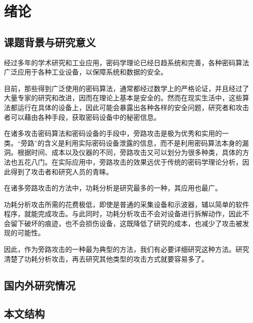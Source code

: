 

\chapter{绪论}

\section{课题背景与研究意义}

经过多年的学术研究和工业应用，密码学理论已经日趋系统和完善，各种密码算法广泛应用于各种工业设备，以保障系统和数据的安全。

目前，那些得到广泛使用的密码算法，通常都经过数学上的严格论证，并且经过了大量专家的研究和改进，因而在理论上基本是安全的。然而在现实生活中，这些算法都运行在具体的设备上，因此可能会暴露出各种各样的安全问题，研究者和攻击者可以藉由各种手段，获取密码设备中的秘密信息。

在诸多攻击密码算法和密码设备的手段中，旁路攻击是极为优秀和实用的一类。“旁路”的含义是利用实际密码设备泄露的信息，而不是利用密码算法本身的漏洞。根据时间、成本以及仪器的不同，旁路攻击又可以划分为很多种类，具体的方法也五花八门。在实际应用中，旁路攻击的效果远优于传统的密码学理论分析，因此得到了攻击者和研究人员的青睐。

在诸多旁路攻击的方法中，功耗分析是研究最多的一种，其应用也最广。

功耗分析攻击所需的花费极低，即使是普通的采集设备和示波器，辅以简单的软件程序，就能完成攻击。与此同时，功耗分析攻击不会对设备进行拆解动作，因此不会留下破坏的痕迹，也不会损伤设备，这既降低了研究的成本，也减少了攻击被发现的可能性。

因此，作为旁路攻击的一种最为典型的方法，我们有必要详细研究这种方法。研究清楚了功耗分析攻击，再去研究其他类型的攻击方式就要容易多了。




\section{国内外研究情况}

\section{本文结构}